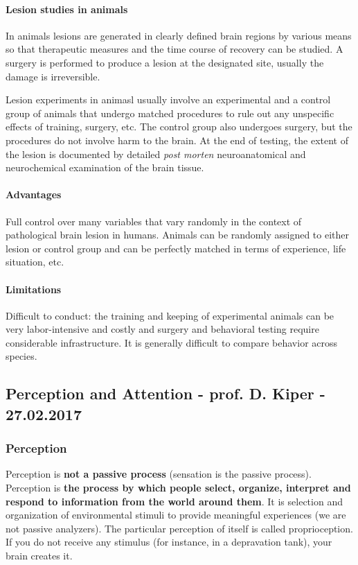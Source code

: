 \documentclass[12pt,article,oneside,a4paper]{memoir}
\begin{document}
\paragraph{Lesion studies in animals}
In animals lesions are generated in clearly defined brain regions by various
means so that therapeutic measures and the time course of recovery can be
studied. A surgery is performed to produce a lesion at the designated site,
usually the damage is irreversible.

Lesion experiments in animasl usually involve an experimental and a control
group of animals that undergo matched procedures to rule out any unspecific
effects of training, surgery, etc. The control group also undergoes surgery,
but the procedures do not involve harm to the brain. At the end of testing,
the extent of the lesion is documented by detailed \textit{post morten}
neuroanatomical and neurochemical examination of the brain tissue.

\paragraph{Advantages}
Full control over many variables that vary randomly in the context of pathological
brain lesion in humans. Animals can be randomly assigned to either lesion or
control group and can be perfectly matched in terms of experience, life situation,
etc.

\paragraph{Limitations}
Difficult to conduct: the training and keeping of experimental animals can be
very labor-intensive and costly and surgery and behavioral testing require
considerable infrastructure. It is generally difficult to compare behavior
across species.

\newpage
\subsection{Perception and Attention - prof. D. Kiper - 27.02.2017}

\subsubsection{Perception}
Perception is \textbf{not a passive process} (sensation is the passive process).
Perception is \textbf{the process by which people select, organize, interpret
and respond to information from the world around them}. It is selection and
organization of environmental stimuli to provide meaningful experiences (we are
not passive analyzers). The particular perception of itself is called
proprioception. If you do not receive any stimulus (for instance, in a depravation
tank), your brain creates it.
\end{document}
